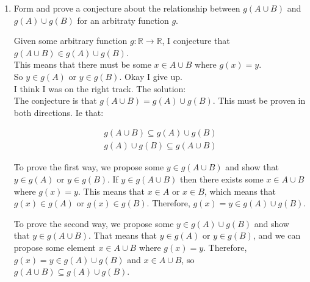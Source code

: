 \documentclass{article}
\numberwithin{equation}{subsection}
\numberwithin{theo}{subsection}
\begin{document}
\begin{enumerate}
\begin{enumerate}
        \item Form and prove a conjecture about the relationship between $g(A \cup B)$ and
            $g(A) \cup g(B)$ for an arbitraty function $g$.

            Given some arbitrary function $g: \mathbb{R} \rightarrow \mathbb{R}$, I
            conjecture that $g(A \cup B) \in g(A) \cup g(B)$.\\

            This means that there must be some $x \in A \cup B$ where $g(x) = y$.\\

            So $y \in g(A)$ or $y \in g(B)$. Okay I give up.\\

            I think I was on the right track. The solution:\\

            The conjecture is that $g(A \cup B) = g(A) \cup g(B)$. This must be proven in
            both directions. Ie that:

            \begin{align}
                g(A \cup B) \subseteq g(A) \cup g(B) \\
                g(A) \cup g(B) \subseteq g(A \cup B)
            \end{align}

            To prove the first way, we propose some $y \in g(A \cup B)$ and show that $y
            \in g(A)$ or $y \in g(B)$. If $y \in g(A \cup B)$ then there exists some $x
            \in A \cup B$ where $g(x) = y$. This means that $x \in A$ or $x \in B$, which
            means that $g(x) \in g(A)$ or $g(x) \in g(B)$. Therefore, $g(x) = y \in g(A)
            \cup g(B)$.
            
            To prove the second way, we propose some $y \in g(A) \cup g(B)$ and show that
            $y \in g(A \cup B)$. That means that $y \in g(A)$ or $y \in g(B)$, and we can
            propose some element $x \in A \cup B$ where $g(x) = y$. Therefore, $g(x) = y
            \in g(A) \cup g(B)$ and $x \in A \cup B$, so $g(A \cup B) \subseteq g(A) \cup
            g(B)$.



        \end{enumerate}


\end{enumerate}
\end{document}
